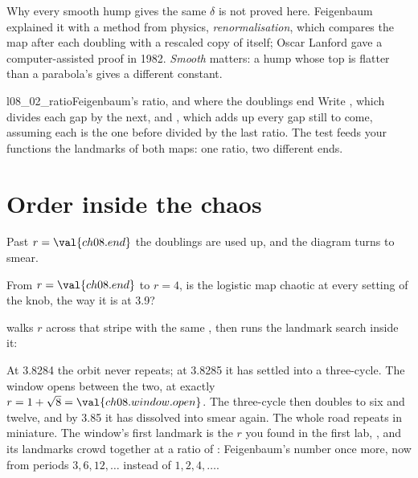 \begin{rigourbox}
Why every smooth hump gives the same $\delta$ is not proved here. Feigenbaum
explained it with a method from physics, \emph{renormalisation}, which
compares the map after each doubling with a rescaled copy of itself; Oscar
Lanford gave a computer-assisted proof in 1982. \emph{Smooth} matters: a hump
whose top is flatter than a parabola's gives a different constant.
\end{rigourbox}

\begin{lab}{l08_02_ratio}{Feigenbaum's ratio, and where the doublings end}
Write , which divides each gap by the next, and
, which adds up every gap still to come, assuming each
is the one before divided by the last ratio. The test feeds your functions
the landmarks of both maps: one ratio, two different ends.
\end{lab}

\section{Order inside the chaos}
\label{sec:ch08-windows}

\noindent
Past $r = \val{ch08.end}$ the doublings are used up, and the diagram turns
to smear.

\begin{think}
From $r = \val{ch08.end}$ to $r = 4$, is the logistic map chaotic at every
setting of the knob, the way it is at \num{3.9}?
\end{think}
 walks $r$ across that stripe with the same
, then runs the landmark search inside it:


\noindent
At \num{3.8284} the orbit never repeats; at \num{3.8285} it has settled into
a three-cycle. The window opens between the two, at exactly
$r = 1 + \sqrt{8} = \val{ch08.window.open}$. The three-cycle then doubles to
six and twelve, and by \num{3.85} it has dissolved into smear again. The
whole road repeats in miniature. The window's first landmark is the $r$ you
found in the first lab, , and its landmarks crowd
together at a ratio of : Feigenbaum's number once
more, now from periods $3, 6, 12, \ldots$ instead of $1, 2, 4, \ldots$.

